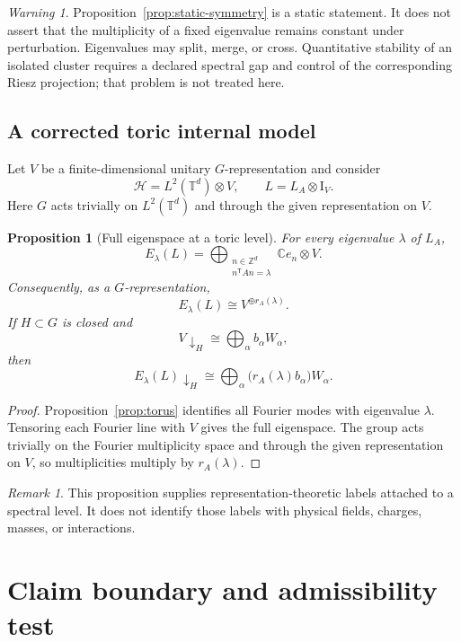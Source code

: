 \documentclass[11pt,a4paper]{article}
\newtheorem{proposition}[theorem]{Proposition}
\theoremstyle{definition}
\theoremstyle{remark}
\newtheorem{remark}[theorem]{Remark}
\newtheorem{warning}[theorem]{Warning}
\newcommand{\C}{\mathbb C}
\newcommand{\Z}{\mathbb Z}
\newcommand{\T}{\mathbb T}
\newcommand{\Hcal}{\mathcal H}
\newcommand{\Id}{\mathrm I}
\begin{document}
\begin{warning}
Proposition~\ref{prop:static-symmetry} is a static statement. It does not assert that the
multiplicity of a fixed eigenvalue remains constant under perturbation.
Eigenvalues may split, merge, or cross. Quantitative stability of an isolated
cluster requires a declared spectral gap and control of the corresponding Riesz
projection; that problem is not treated here.
\end{warning}

\subsection{A corrected toric internal model}

Let \(V\) be a finite-dimensional unitary \(G\)-representation and consider
\[
 \Hcal=L^2(\T^d)\otimes V,
 \qquad
 L=L_A\otimes\Id_V.
\]
Here \(G\) acts trivially on \(L^2(\T^d)\) and through the given
representation on \(V\).

\begin{proposition}[Full eigenspace at a toric level]
\label{prop:toric-internal}
For every eigenvalue \(\lambda\) of \(L_A\),
\[
 E_\lambda(L)
 =
 \bigoplus_{\substack{n\in\Z^d\\n^{\mathsf T}An=\lambda}}
 \C e_n\otimes V.
\]
Consequently, as a \(G\)-representation,
\[
 E_\lambda(L)\cong V^{\oplus r_A(\lambda)}.
\]
If \(H\subset G\) is closed and
\[
 V\!\downarrow_H\cong\bigoplus_\alpha b_\alpha W_\alpha,
\]
then
\[
 E_\lambda(L)\!\downarrow_H
 \cong
 \bigoplus_\alpha
 \bigl(r_A(\lambda)b_\alpha\bigr)W_\alpha.
\]
\end{proposition}

\begin{proof}
Proposition~\ref{prop:torus} identifies all Fourier modes with eigenvalue \(\lambda\).
Tensoring each Fourier line with \(V\) gives the full eigenspace. The group acts
trivially on the Fourier multiplicity space and through the given
representation on \(V\), so multiplicities multiply by \(r_A(\lambda)\).
\end{proof}

\begin{remark}
This proposition supplies representation-theoretic labels attached to a
spectral level. It does not identify those labels with physical fields,
charges, masses, or interactions.
\end{remark}

\section{Claim boundary and admissibility test}
\end{document}
